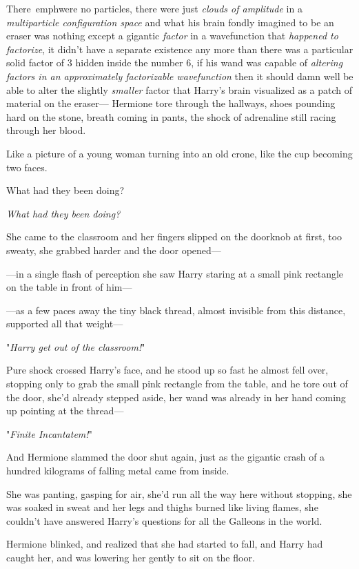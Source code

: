There\ emph{were no particles,} there were just \emph{clouds of amplitude} in a 
\emph{multiparticle configuration space} and what his brain fondly imagined to 
be an eraser was nothing except a gigantic \emph{factor} in a wavefunction that 
\emph{happened to factorize}, it didn't have a separate existence any more than 
there was a particular solid factor of 3 hidden inside the number 6, if his 
wand was capable of \emph{altering factors in an approximately factorizable 
wavefunction} then it should damn well be able to alter the slightly 
\emph{smaller} factor that Harry's brain visualized as a patch of material on 
the eraser---
\sbreak
Hermione tore through the hallways, shoes pounding hard on the stone, breath 
coming in pants, the shock of adrenaline still racing through her blood.

Like a picture of a young woman turning into an old crone, like the cup 
becoming two faces.

What had they been doing?

\emph{What had they been doing?}

She came to the classroom and her fingers slipped on the doorknob at first, too 
sweaty, she grabbed harder and the door opened---

---in a single flash of perception she saw Harry staring at a small pink 
rectangle on the table in front of him---

---as a few paces away the tiny black thread, almost invisible from this 
distance, supported all that weight---

"\emph{Harry get out of the classroom!}"

Pure shock crossed Harry's face, and he stood up so fast he almost fell over, 
stopping only to grab the small pink rectangle from the table, and he tore out 
of the door, she'd already stepped aside, her wand was already in her hand 
coming up pointing at the thread---

"\emph{Finite Incantatem!}"

And Hermione slammed the door shut again, just as the gigantic crash of a 
hundred kilograms of falling metal came from inside.

She was panting, gasping for air, she'd run all the way here without stopping, 
she was soaked in sweat and her legs and thighs burned like living flames, she 
couldn't have answered Harry's questions for all the Galleons in the world.

Hermione blinked, and realized that she had started to fall, and Harry had 
caught her, and was lowering her gently to sit on the floor.

